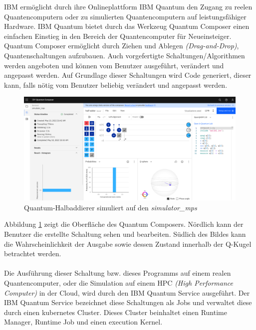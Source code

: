 IBM erm\"oglicht durch ihre Onlineplattform IBM Quantum \cite{IBM_Quantum} den Zugang zu reelen Quantencomputern oder zu simulierten Quantencomputern auf leistungsf\"ahiger Hardware. IBM Quantum bietet durch das Werkzeug Quantum Composer einen einfachen Einstieg in den Bereich der Quantencomputer f\"ur Neueinsteiger. Quantum Composer erm\"oglicht durch Ziehen und Ablegen \textit{(Drag-and-Drop)}, Quantenschaltungen aufzubauen. Auch vorgefertigte Schaltungen/Algorithmen werden angeboten und k\"onnen vom Benutzer ausgef\"uhrt, ver\"andert und angepasst werden. Auf Grundlage dieser Schaltungen wird Code generiert, dieser kann, falls n\"otig vom Benutzer beliebig ver\"andert und angepasst werden.
\begin{figure}[h]
\centering
\includegraphics[width=1\textwidth]{figures/half_adder_composer.png}
\caption{Quantum-Halbaddierer simuliert auf den \textit{simulator_mps}}
\label{fig:quantum-composer}
\end{figure}
Abbildung \ref{fig:quantum-composer} zeigt die Oberfl\"ache des Quantum Composers. N\"ordlich kann der Benutzer die erstellte Schaltung sehen und bearbeiten. S\"udlich des Bildes kann die Wahrscheinlichkeit der Ausgabe sowie dessen Zustand innerhalb der Q-Kugel betrachtet werden. \\\\
Die Ausf\"uhrung dieser Schaltung bzw. dieses Programms auf einem realen Quantencomputer, oder die Simulation auf einem HPC \textit{(High Performance Computer)} in der Cloud, wird durch den IBM Quantum Service ausgef\"uhrt. Der IBM Quantum Service bezeichnet diese Schaltungen als Jobs und verwaltet diese durch einen kubernetes Cluster. Dieses Cluster beinhaltet einen Runtime Manager, Runtime Job und einen execution Kernel.\\\\
